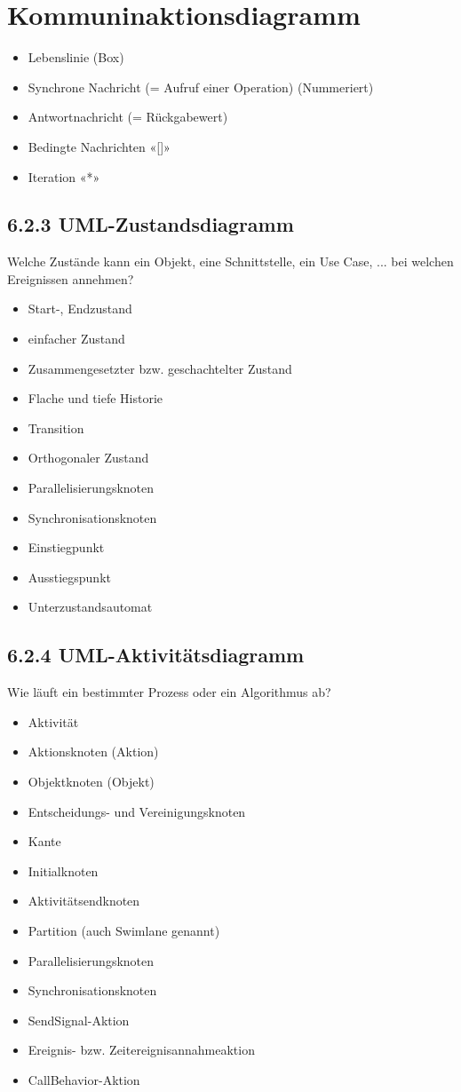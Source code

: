 \section*{Kommuninaktionsdiagramm}
\begin{itemize}
  \item Lebenslinie (Box)
  \item Synchrone Nachricht (= Aufruf einer Operation) (Nummeriert)
  \item Antwortnachricht (= Rückgabewert)
  \item Bedingte Nachrichten «[]»
  \item Iteration «*»
\end{itemize}

\subsection*{6.2.3 UML-Zustandsdiagramm}
Welche Zustände kann ein Objekt, eine Schnittstelle, ein Use Case, ... bei welchen Ereignissen annehmen?

\begin{itemize}
  \item Start-, Endzustand
  \item einfacher Zustand
  \item Zusammengesetzter bzw. geschachtelter Zustand
  \item Flache und tiefe Historie
  \item Transition
  \item Orthogonaler Zustand
  \item Parallelisierungsknoten
  \item Synchronisationsknoten
  \item Einstiegpunkt
  \item Ausstiegspunkt
  \item Unterzustandsautomat
\end{itemize}

\subsection*{6.2.4 UML-Aktivitätsdiagramm}
Wie läuft ein bestimmter Prozess oder ein Algorithmus ab?

\begin{itemize}
  \item Aktivität
  \item Aktionsknoten (Aktion)
  \item Objektknoten (Objekt)
  \item Entscheidungs- und Vereinigungsknoten
  \item Kante
  \item Initialknoten
  \item Aktivitätsendknoten
  \item Partition (auch Swimlane genannt)
  \item Parallelisierungsknoten
  \item Synchronisationsknoten
  \item SendSignal-Aktion
  \item Ereignis- bzw. Zeitereignisannahmeaktion
  \item CallBehavior-Aktion
\end{itemize}

